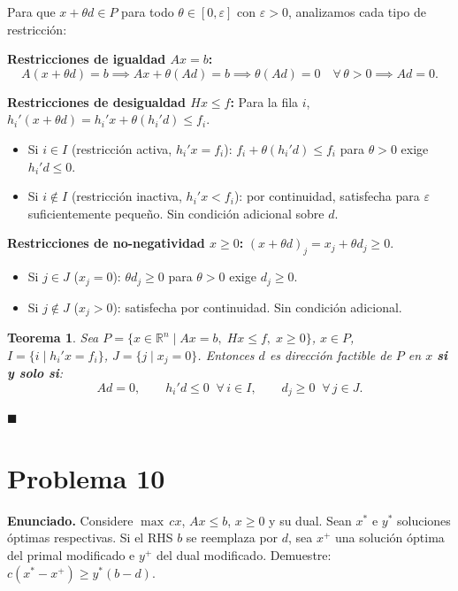 \documentclass{article}
\newtheorem*{teo}{Teorema}
\begin{document}
Para que $x + \theta d \in P$ para todo $\theta \in [0, \varepsilon]$ con $\varepsilon > 0$, analizamos cada tipo de restricción:

\medskip
\textbf{Restricciones de igualdad $Ax = b$:}
\[
  A(x + \theta d) = b \implies Ax + \theta(Ad) = b \implies \theta(Ad) = 0 \quad \forall\, \theta > 0 \implies \boxed{Ad = 0.}
\]

\textbf{Restricciones de desigualdad $Hx \leq f$:} Para la fila $i$, $h_i'(x + \theta d) = h_i'x + \theta(h_i'd) \leq f_i$.
\begin{itemize}
  \item Si $i \in I$ (restricción activa, $h_i'x = f_i$): $f_i + \theta(h_i'd) \leq f_i$ para $\theta > 0$ exige $\boxed{h_i'd \leq 0}$.
  \item Si $i \notin I$ (restricción inactiva, $h_i'x < f_i$): por continuidad, satisfecha para $\varepsilon$ suficientemente pequeño. Sin condición adicional sobre $d$.
\end{itemize}

\textbf{Restricciones de no-negatividad $x \geq 0$:} $(x + \theta d)_j = x_j + \theta d_j \geq 0$.
\begin{itemize}
  \item Si $j \in J$ ($x_j = 0$): $\theta d_j \geq 0$ para $\theta > 0$ exige $\boxed{d_j \geq 0}$.
  \item Si $j \notin J$ ($x_j > 0$): satisfecha por continuidad. Sin condición adicional.
\end{itemize}

\begin{teo}
Sea $P = \{x \in \mathbb{R}^n \mid Ax = b,\; Hx \leq f,\; x \geq 0\}$, $x \in P$, $I = \{i \mid h_i'x = f_i\}$, $J = \{j \mid x_j = 0\}$. Entonces $d$ es dirección factible de $P$ en $x$ \textbf{si y solo si}:
\[
  Ad = 0, \qquad h_i'd \leq 0 \;\;\forall\, i \in I, \qquad d_j \geq 0 \;\;\forall\, j \in J.
\]
\end{teo}

$\blacksquare$

\section*{Problema 10}

\textbf{Enunciado.} Considere $\max\, cx$, $Ax \leq b$, $x \geq 0$ y su dual. Sean $x^*$ e $y^*$ soluciones óptimas respectivas. Si el RHS $b$ se reemplaza por $d$, sea $x^+$ una solución óptima del primal modificado e $y^+$ del dual modificado. Demuestre: $c(x^* - x^+) \geq y^*(b - d)$.
\end{document}
